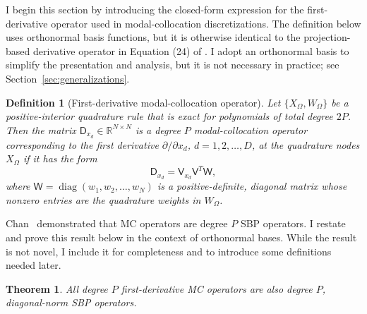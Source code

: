 \documentclass[pdflatex,sn-mathphys-num]{sn-jnl}%
\theoremstyle{thmstyleone}%
\newtheorem{theorem}{Theorem}%
\theoremstyle{thmstyletwo}%
\theoremstyle{thmstylethree}%
\newtheorem{definition}{Definition}%
\newcommand{\mat}[1]{\ensuremath{\mathsf{#1}}}
\DeclareMathOperator{\diag}{diag}
\begin{document}
I begin this section by introducing the closed-form expression for the first-derivative operator used in modal-collocation discretizations.  The definition below uses orthonormal basis functions, but it is otherwise identical to the projection-based derivative operator in Equation (24) of \cite{Chan2018discretely}.  I adopt an orthonormal basis to simplify the presentation and analysis, but it is not necessary in practice; see Section~\ref{sec:generalizations}.

\begin{definition}[First-derivative modal-collocation operator]\label{def:mc}
    Let $\{ X_{\Omega}, W_{\Omega}\}$ be a positive-interior quadrature rule that is exact for polynomials of total degree $2P$.  Then the matrix $\mat{D}_{x_d} \in \mathbb{R}^{N\times N}$ is a degree $P$ modal-collocation operator corresponding to the first derivative $\partial/\partial x_{d}$,  $d=1,2,\ldots,D$, at the quadrature nodes $X_{\Omega}$ if it has the form 
    \begin{equation*}
        \mat{D}_{x_d} = \mat{V}_{x_d} \mat{V}^T \mat{W},
    \end{equation*}
    where $\mat{W} = \diag(w_1, w_2, \ldots,w_N)$ is a positive-definite, diagonal matrix whose nonzero entries are the quadrature weights in $W_{\Omega}$. 
\end{definition}

Chan~\cite[Lemma~1]{Chan2018discretely} demonstrated that MC operators are degree $P$ SBP operators.  I restate and prove this result below in the context of orthonormal bases.  While the result is not novel, I include it for completeness and to introduce some definitions needed later.


\begin{theorem}\label{thm:mc_are_sbp}
All degree $P$ first-derivative MC operators are also degree $P$, diagonal-norm SBP operators.
\end{theorem}
\end{document}
